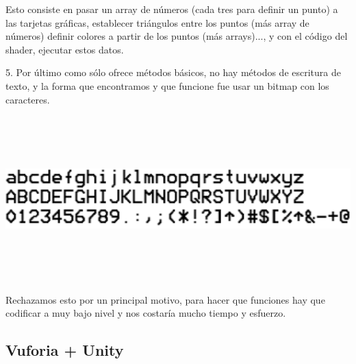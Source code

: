 Esto consiste en pasar un array de números (cada tres para definir un punto) 
a las tarjetas gráficas, establecer triángulos entre los puntos (más array de números) 
definir colores a partir de los puntos (más arrays)..., y con el código del shader, ejecutar 
estos datos.

5. Por último como sólo ofrece métodos básicos, no hay métodos de escritura de texto, y la forma que 
encontramos y que funcione fue usar un bitmap con los caracteres.

\includegraphics[height=2.5in]{figures/bitmap-font.png}

Rechazamos esto por un principal motivo, para hacer que funciones hay que codificar a muy bajo nivel y 
nos costaría mucho tiempo y esfuerzo.
 
\subsection{Vuforia + Unity} 
\label{makereference3.6.4}